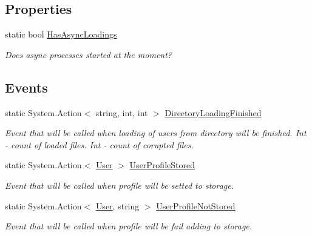 \subsection*{Properties}
\begin{DoxyCompactItemize}
\item 
static bool \mbox{\hyperlink{class_authority_controller_1_1_a_p_i_1_1_users_ac4f1b22cd4a3e351ba6f7e438abead57}{Has\+Async\+Loadings}}
\begin{DoxyCompactList}\small\item\em Does async processes started at the moment? \end{DoxyCompactList}\end{DoxyCompactItemize}
\subsection*{Events}
\begin{DoxyCompactItemize}
\item 
static System.\+Action$<$ string, int, int $>$ \mbox{\hyperlink{class_authority_controller_1_1_a_p_i_1_1_users_af7bf2041f53bc5910235a72778703786}{Directory\+Loading\+Finished}}
\begin{DoxyCompactList}\small\item\em Event that will be called when loading of users from directory will be finished. Int -\/ count of loaded files. Int -\/ count of corupted files. \end{DoxyCompactList}\item 
static System.\+Action$<$ \mbox{\hyperlink{class_authority_controller_1_1_data_1_1_personal_1_1_user}{User}} $>$ \mbox{\hyperlink{class_authority_controller_1_1_a_p_i_1_1_users_a38d89296f7a63c029fe5873e12451ce3}{User\+Profile\+Stored}}
\begin{DoxyCompactList}\small\item\em Event that will be called when profile will be setted to storage. \end{DoxyCompactList}\item 
static System.\+Action$<$ \mbox{\hyperlink{class_authority_controller_1_1_data_1_1_personal_1_1_user}{User}}, string $>$ \mbox{\hyperlink{class_authority_controller_1_1_a_p_i_1_1_users_a1f3af72fd317a1786bcf89c4ab55e3a1}{User\+Profile\+Not\+Stored}}
\begin{DoxyCompactList}\small\item\em Event that will be called when profile will be fail adding to storage. \end{DoxyCompactList}\end{DoxyCompactItemize}
